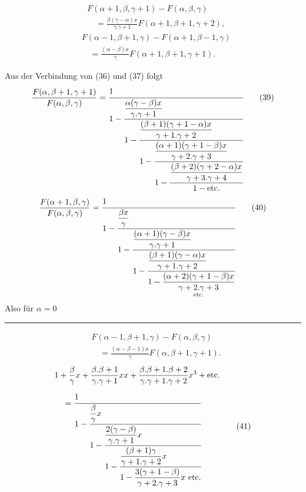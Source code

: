 \begin{equation}
\begin{aligned}
&F(\alpha+1,\beta,\gamma+1)-F(\alpha,\beta,\gamma)\\
&\quad=\frac{\beta(\gamma-\alpha)x}{\gamma{.}\gamma+1}F(\alpha+1,\beta+1,\gamma+2),
\end{aligned}\tag*{(37)}
\end{equation}
\begin{equation}
\begin{aligned}
&F(\alpha-1,\beta+1,\gamma)-F(\alpha+1,\beta-1,\gamma)\\
&\quad=\frac{(\alpha-\beta)x}{\gamma}F(\alpha+1,\beta+1,\gamma+1).
\end{aligned}\tag*{(38)}
\end{equation}

Aus der Verbindung von (36) und (37) folgt
\begin{equation}
\frac{F(\alpha,\beta+1,\gamma+1)}{F(\alpha,\beta,\gamma)}
=\cfrac[l]{1}{1-\cfrac[l]{\dfrac{\alpha(\gamma-\beta)x}{\gamma{.}\gamma+1}}
 {1-\cfrac[l]{\dfrac{(\beta+1)(\gamma+1-\alpha)x}{\gamma+1{.}\gamma+2}}
 {1-\cfrac[l]{\dfrac{(\alpha+1)(\gamma+1-\beta)x}{\gamma+2{.}\gamma+3}}
 {1-\cfrac[l]{\dfrac{(\beta+2)(\gamma+2-\alpha)x}{\gamma+3{.}\gamma+4}}
 {1-\mathrm{etc.}}}}}}
\tag*{(39)}
\end{equation}
\begin{equation}
\frac{F(\alpha+1,\beta,\gamma)}{F(\alpha,\beta,\gamma)}
=\cfrac[l]{1}{1-\cfrac[l]{\dfrac{\beta x}{\gamma}}
 {1-\cfrac[l]{\dfrac{(\alpha+1)(\gamma-\beta)x}{\gamma{.}\gamma+1}}
 {1-\cfrac[l]{\dfrac{(\beta+1)(\gamma-\alpha)x}{\gamma+1{.}\gamma+2}}
 {1-\underset{\mathrm{etc.}}{\dfrac{(\alpha+2)(\gamma+1-\beta)x}{\gamma+2{.}\gamma+3}}}}}}
\tag*{(40)}
\end{equation}
\noindent Also für $\alpha=0$
\par\medskip\hrule\smallskip
{\small{}
\[
\begin{aligned}
&F(\alpha-1,\beta+1,\gamma)-F(\alpha,\beta,\gamma)\\
&\quad=\frac{(\alpha-\beta-1)x}{\gamma}F(\alpha,\beta+1,\gamma+1).
\end{aligned}
\]
}
\clearpage{}
\begin{equation}
\begin{aligned}
&1+\frac{\beta}{\gamma}x+\frac{\beta{.}\beta+1}{\gamma{.}\gamma+1}xx
 +\frac{\beta{.}\beta+1{.}\beta+2}{\gamma{.}\gamma+1{.}\gamma+2}x^3+\mathrm{etc.}\\[1.2ex]
&\quad=\cfrac[l]{1}{1-\cfrac[l]{\dfrac{\beta}{\gamma}x}
 {1-\cfrac[l]{\dfrac{2(\gamma-\beta)}{\gamma{.}\gamma+1}x}
 {1-\cfrac[l]{\dfrac{(\beta+1)\gamma}{\gamma+1{.}\gamma+2}x}
 {1-\dfrac{3(\gamma+1-\beta)}{\gamma+2{.}\gamma+3}x\ \mathrm{etc.}}}}}
\end{aligned}\tag*{(41)}
\end{equation}
\clearpage
\endgroup
